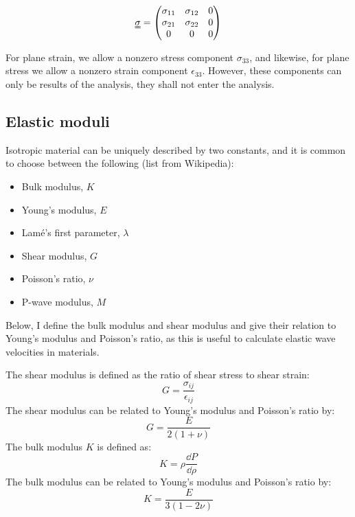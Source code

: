 \begin{equation}
\uuline \sigma = 
\begin{pmatrix}
	\sigma_{11} & \sigma_{12} & 0 \\
	\sigma_{21} & \sigma_{22} & 0 \\
	0 & 0 & 0
\end{pmatrix}
\label{eq:plane_stress}
\end{equation}

For plane strain, we allow a nonzero stress component $\sigma_{33}$, and likewise, for plane stress we allow a nonzero strain component $\epsilon_{33}$. However, these components can only be results of the analysis, they shall not enter the analysis. 

\subsection{Elastic moduli}
Isotropic material can be uniquely described by two constants, and it is common to choose between the following (list from Wikipedia):
\begin{itemize}
\item Bulk modulus, $K$
\item Young's modulus, $E$
\item Lamé's first parameter, $\lambda$
\item Shear modulus, $G$
\item Poisson's ratio, $\nu$
\item P-wave modulus, $M$
\end{itemize}
Below, I define the bulk modulus and shear modulus and give their relation to Young's modulus and Poisson's ratio, as this is useful to calculate elastic wave velocities in materials.

The shear modulus is defined as the ratio of shear stress to shear strain:
\begin{equation}
	G = \frac{\sigma_{ij}}{\epsilon_{ij}}
\end{equation}
The shear modulus can be related to Young's modulus and Poisson's ratio by:
\begin{equation}
	G = \frac{E}{2(1+\nu)}
\end{equation}
The bulk modulus $K$ is defined as:
\begin{equation}
	K = \rho\frac{\dd P}{\dd \rho}
\end{equation}
The bulk modulus can be related to Young's modulus and Poisson's ratio by:\begin{equation}
	K = \frac{E}{3(1-2\nu)}
\end{equation}


